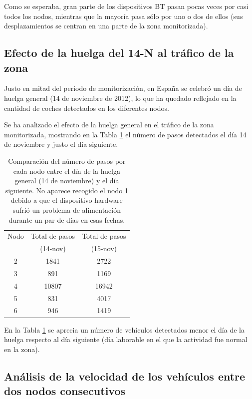 \documentclass[twocolumn,twoside]{Jornadas}
\begin{document}
Como se esperaba, gran parte de los dispositivos BT pasan pocas veces por casi todos los nodos, mientras que la mayoría pasa sólo por uno o dos de ellos 
(sus desplazamientos se centran en una parte de la zona monitorizada).


 
\subsection{Efecto de la huelga del 14-N al tráfico de la zona}

Justo en mitad del periodo de monitorización, en España se celebró un día de huelga general (14 de noviembre de 2012), lo que ha quedado reflejado en la cantidad de coches detectados en los diferentes nodos.

Se ha analizado el efecto de la huelga general en el tráfico de la zona monitorizada, mostrando en la Tabla \ref{huelga} el número de pasos detectados el día 14 de noviembre y justo el día siguiente.

 \begin{table}
 \caption{Comparación del número de pasos por cada nodo entre el día de la huelga general (14 de noviembre) y el día siguiente. No aparece recogido el nodo 1 debido a que el dispositivo hardware sufrió un problema de alimentación durante un par de días en esas fechas.
 \label{huelga}}
 \begin{center}
 \begin{tabular}{|c|c|c|}
 \hline
 Nodo  &  Total de pasos  & Total de pasos  \\
       &  (14-nov) & (15-nov) \\
 \hline
 2	& 1841  & 2722  \\
 \hline
 3	& 891   & 1169 \\
 \hline
 4	& 10807	& 16942 \\
 \hline
 5	& 831  	& 4017\\
 \hline
 6	& 946   & 1419 \\
 \hline
 \end{tabular}
 \end{center}
 \end{table}

En la Tabla \ref{huelga} se aprecia un número de vehículos detectados menor el día de la huelga respecto al día siguiente (día laborable en el que la actividad fue normal en la zona).



\subsection{Análisis de la velocidad de los vehículos entre dos nodos consecutivos}
\end{document}
